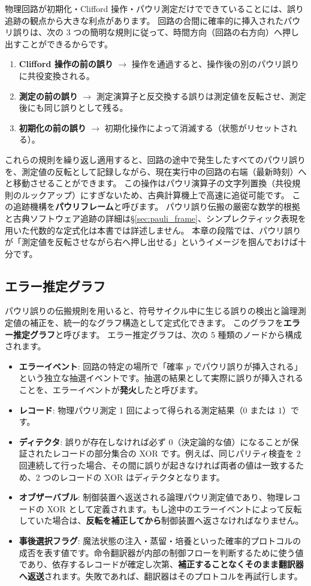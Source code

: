 物理回路が初期化・Clifford 操作・パウリ測定だけでできていることには、誤り追跡の観点から大きな利点があります。
回路の合間に確率的に挿入されたパウリ誤りは、次の 3 つの簡明な規則に従って、時間方向（回路の右方向）へ押し出すことができるからです。
\begin{enumerate}
  \item \textbf{Clifford 操作の前の誤り} $\to$ 操作を通過すると、操作後の別のパウリ誤りに共役変換される。
  \item \textbf{測定の前の誤り} $\to$ 測定演算子と反交換する誤りは測定値を反転させ、測定後にも同じ誤りとして残る。
  \item \textbf{初期化の前の誤り} $\to$ 初期化操作によって消滅する（状態がリセットされる）。
\end{enumerate}
これらの規則を繰り返し適用すると、回路の途中で発生したすべてのパウリ誤りを、測定値の反転として記録しながら、現在実行中の回路の右端（最新時刻）へと移動させることができます。
この操作はパウリ演算子の文字列置換（共役規則のルックアップ）にすぎないため、古典計算機上で高速に追従可能です。
この追跡機構を\textbf{パウリフレーム}と呼びます。
パウリ誤り伝搬の厳密な数学的根拠と古典ソフトウェア追跡の詳細は§\ref{sec:pauli_frame}、シンプレクティック表現を用いた代数的な定式化は本書では詳述しません。
本章の段階では、パウリ誤りが「測定値を反転させながら右へ押し出せる」というイメージを掴んでおけば十分です。

\subsection{エラー推定グラフ}

パウリ誤りの伝搬規則を用いると、符号サイクル中に生じる誤りの検出と論理測定値の補正を、統一的なグラフ構造として定式化できます。
このグラフを\textbf{エラー推定グラフ}と呼びます。
エラー推定グラフは、次の 5 種類のノードから構成されます。

\begin{itemize}
  \item \textbf{エラーイベント}: 回路の特定の場所で「確率 $p$ でパウリ誤りが挿入される」という独立な抽選イベントです。抽選の結果として実際に誤りが挿入されることを、エラーイベントが\textbf{発火}したと呼びます。
  \item \textbf{レコード}: 物理パウリ測定 1 回によって得られる測定結果（$0$ または $1$）です。
  \item \textbf{ディテクタ}: 誤りが存在しなければ必ず $0$（決定論的な値）になることが保証されたレコードの部分集合の XOR です。例えば、同じパリティ検査を 2 回連続して行った場合、その間に誤りが起きなければ両者の値は一致するため、2 つのレコードの XOR はディテクタとなります。
  \item \textbf{オブザーバブル}: 制御装置へ返送される論理パウリ測定値であり、物理レコードの XOR として定義されます。もし途中のエラーイベントによって反転していた場合は、\textbf{反転を補正してから}制御装置へ返さなければなりません。
  \item \textbf{事後選択フラグ}: 魔法状態の注入・蒸留・培養といった確率的プロトコルの成否を表す値です。命令翻訳器が内部の制御フローを判断するために使う値であり、依存するレコードが確定し次第、\textbf{補正することなくそのまま翻訳器へ返送}されます。失敗であれば、翻訳器はそのプロトコルを再試行します。
\end{itemize}

